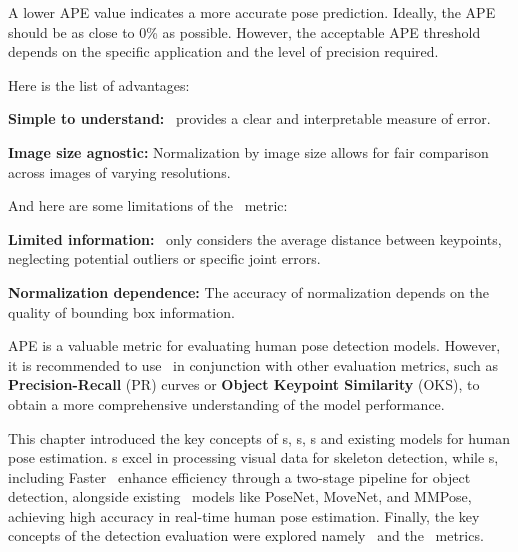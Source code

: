 A lower APE value indicates a more accurate pose prediction. Ideally, the APE should be as close to 0\% as possible. However, the acceptable APE threshold depends on the specific application and the level of precision required.

Here is the list of advantages:
\startitemize[1]
    \item {\bf Simple to understand:} \APE\ provides a clear and interpretable measure of error.
    \item {\bf Image size agnostic:} Normalization by image size allows for fair comparison across images of varying resolutions.
\stopitemize

And here are some limitations of the \APE\ metric:
\startitemize[1]
    \item {\bf Limited information:} \APE\ only considers the average distance between keypoints, neglecting potential outliers or specific joint errors.
    \item {\bf Normalization dependence:} The accuracy of normalization depends on the quality of bounding box information.
\stopitemize

APE is a valuable metric for evaluating human pose detection models. However, it is recommended to use \APE\ in conjunction with other evaluation metrics, such as {\bf Precision-Recall} (PR) curves or {\bf Object Keypoint Similarity} (OKS), to obtain a more comprehensive understanding of the model performance.

This chapter introduced the key concepts of \NN\-s, \CNN\-s, \RCNN\-s and existing models for human pose estimation. \CNN\-s excel in processing visual data for skeleton detection, while \RCNN\-s, including Faster \RCNN\, enhance efficiency through a two-stage pipeline for object detection, alongside existing \NN\ models like PoseNet, MoveNet, and MMPose, achieving high accuracy in real-time human pose estimation. Finally, the key concepts of the detection evaluation were explored namely \APE\ and the \OKS\ metrics.
